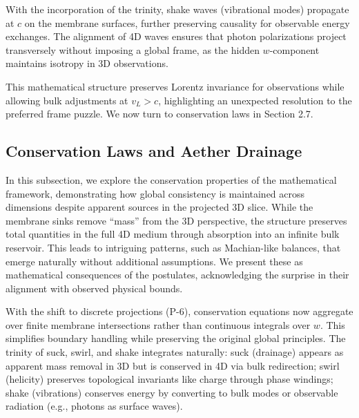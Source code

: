With the incorporation of the trinity, shake waves (vibrational modes) propagate at $c$ on the membrane surfaces, further preserving causality for observable energy exchanges. The alignment of 4D waves ensures that photon polarizations project transversely without imposing a global frame, as the hidden $w$-component maintains isotropy in 3D observations.

\medskip
\noindent
{}
\medskip

This mathematical structure preserves Lorentz invariance for observations while allowing bulk adjustments at $v_L > c$, highlighting an unexpected resolution to the preferred frame puzzle. We now turn to conservation laws in Section 2.7.

\subsection{Conservation Laws and Aether Drainage}

In this subsection, we explore the conservation properties of the mathematical framework, demonstrating how global consistency is maintained across dimensions despite apparent sources in the projected 3D slice. While the membrane sinks remove ``mass'' from the 3D perspective, the structure preserves total quantities in the full 4D medium through absorption into an infinite bulk reservoir. This leads to intriguing patterns, such as Machian-like balances, that emerge naturally without additional assumptions. We present these as mathematical consequences of the postulates, acknowledging the surprise in their alignment with observed physical bounds.

With the shift to discrete projections (P-6), conservation equations now aggregate over finite membrane intersections rather than continuous integrals over $w$. This simplifies boundary handling while preserving the original global principles. The trinity of suck, swirl, and shake integrates naturally: suck (drainage) appears as apparent mass removal in 3D but is conserved in 4D via bulk redirection; swirl (helicity) preserves topological invariants like charge through phase windings; shake (vibrations) conserves energy by converting to bulk modes or observable radiation (e.g., photons as surface waves).

